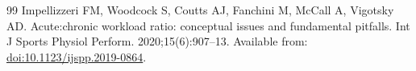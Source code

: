 \documentclass[11pt]{article}
\begin{document}
\begin{thebibliography}{99}
 Impellizzeri FM, Woodcock S, Coutts AJ, Fanchini M, McCall A, Vigotsky AD. Acute:chronic workload ratio: conceptual issues and fundamental pitfalls. Int J Sports Physiol Perform. 2020;15(6):907--13. Available from: \href{https://doi.org/10.1123/ijspp.2019-0864}{doi:10.1123/ijspp.2019-0864}.

\end{thebibliography}
\end{document}

